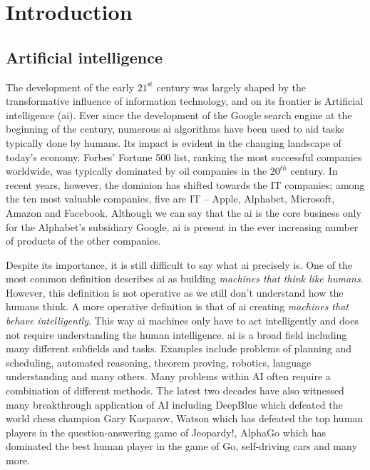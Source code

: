 \chapter{Introduction}\label{ch:introduction}


\section{Artificial intelligence}


The development of the early $21^{\text{st}}$ century was largely shaped by the transformative influence of information technology, and on its frontier is  Artificial intelligence (\gls{ai}).
Ever since the development of the Google search engine at the beginning of the century, numerous \gls{ai} algorithms have been used to aid tasks typically done by humans.
Its impact is evident in the changing landscape of today's economy.
Forbes' Fortune 500 list, ranking the most successful companies worldwide, was typically dominated by oil companies in the $20^{th}$ century.
In recent years, however, the dominion has shifted towards the IT companies; among the ten most valuable companies, five are IT -- Apple, Alphabet, Microsoft, Amazon and Facebook.
Although we can say that the \gls{ai} is the core business only for the Alphabet's subsidiary Google, \gls{ai} is present in the ever increasing number of products of the other companies.







Despite its importance, it is still difficult to say what \gls{ai} precisely is. 
One of the most common definition describes \gls{ai} as building \textit{machines that think like humans}.
However, this definition is not operative as we still don't understand how the humans think.
A more operative definition is that of \gls{ai} creating \textit{machines that behave intelligently}.
This  way \gls{ai} machines only have to act intelligently and does not require understanding the human intelligence.
\gls{ai} is a broad field including many different subfields and tasks.
Examples include problems of planning and scheduling, automated reasoning, theorem proving, robotics, language understanding and many others.
Many problems within AI often require a combination of different methods.
The latest two decades have also witnessed many breakthrough application of AI including DeepBlue \cite{Hsu:2002:BDB:601291}  which defeated the world chess champion Gary Kasparov, Watson \cite{journals/aim/FerrucciBCFGKLMNPSW10} which has defeated the top human players in the question-answering game of Jeopardy!, AlphaGo \cite{SilverHuangEtAl16nature,silver2017mastering} which has dominated the best human player in the game of Go, self-driving cars and many more.





